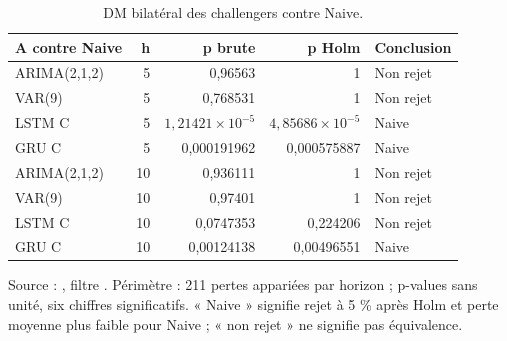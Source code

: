 \begin{table}[!htbp]
\centering
\caption{DM bilatéral des challengers contre Naive.}
\label{tab:dm}
\small
\setlength{\tabcolsep}{4pt}
\renewcommand{\arraystretch}{1.16}
\begin{tabularx}{\linewidth}{XrrrX}
\toprule
\textbf{A contre Naive} & \textbf{h} & \textbf{p brute} & \textbf{p Holm} & \textbf{Conclusion} \\
\midrule
ARIMA(2,1,2) & 5 & 0,96563 & 1 & Non rejet \\
VAR(9) & 5 & 0,768531 & 1 & Non rejet \\
LSTM C & 5 & \(1{,}21421\times 10^{-5}\) & \(4{,}85686\times 10^{-5}\) & Naive \\
GRU C & 5 & 0,000191962 & 0,000575887 & Naive \\
ARIMA(2,1,2) & 10 & 0,936111 & 1 & Non rejet \\
VAR(9) & 10 & 0,97401 & 1 & Non rejet \\
LSTM C & 10 & 0,0747353 & 0,224206 & Non rejet \\
GRU C & 10 & 0,00124138 & 0,00496551 & Naive \\
\bottomrule
\end{tabularx}
\par\smallskip
\begin{minipage}{\linewidth}\footnotesize Source : , filtre . Périmètre : 211 pertes appariées par horizon ; p-values sans unité, six chiffres significatifs. « Naive » signifie rejet à 5 \% après Holm et perte moyenne plus faible pour Naive ; « non rejet » ne signifie pas équivalence.
\end{minipage}
\end{table}
